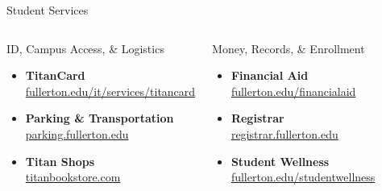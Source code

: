 \documentclass[10pt,aspectratio=169]{beamer}
\begin{document}
\begin{frame}{Student Services}
\begin{columns}[T,onlytextwidth]
  \begin{block}{ID, Campus Access, \& Logistics}
    \begin{itemize}\setlength{\itemsep}{4pt}
      \item \textbf{TitanCard}\\[-2pt]
        \footnotesize\href{https://www.fullerton.edu/it/services/titancard/}{fullerton.edu/it/services/titancard}
      \item \textbf{Parking \& Transportation}\\[-2pt]
        \footnotesize\href{https://parking.fullerton.edu}{parking.fullerton.edu}
      \item \textbf{Titan Shops}\\[-2pt]
        \footnotesize\href{https://www.titanbookstore.com}{titanbookstore.com}
    \end{itemize}
  \end{block}

  \begin{block}{Money, Records, \& Enrollment}
    \begin{itemize}\setlength{\itemsep}{4pt}
      \item \textbf{Financial Aid}\\[-2pt]
        \footnotesize\href{https://www.fullerton.edu/financialaid}{fullerton.edu/financialaid}
      \item \textbf{Registrar}\\[-2pt]
        \footnotesize\href{https://registrar.fullerton.edu/}{registrar.fullerton.edu}
      \item \textbf{Student Wellness}\\[-2pt]
        \footnotesize\href{https://www.fullerton.edu/studentwellness}{fullerton.edu/studentwellness}
    \end{itemize}
  \end{block}
\end{columns}
\end{frame}
\end{document}

